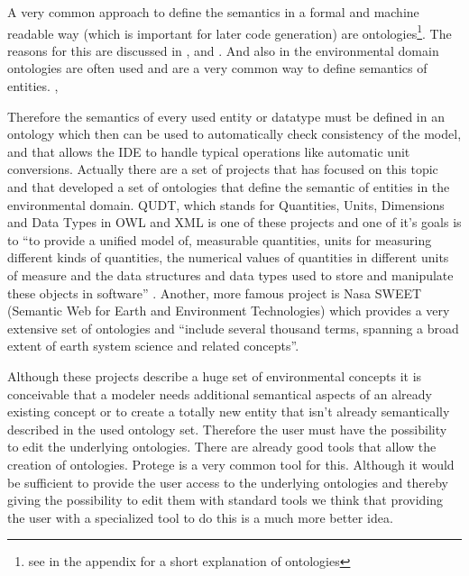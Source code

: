 A very common approach to define the semantics in a formal and machine readable way (which is important for later code generation) are ontologies\footnote{see  in the appendix for a short explanation of ontologies}. The reasons for this are discussed in \autocite{toolchain:protege_onto}, \autocite{toolchain:gruber} and \autocite{toolchain:musen}. And also in the environmental domain ontologies are often used and are a very common way to define semantics of entities. \autocite{dsl:muetzelfeldt}, \autocite{Villa2009577}


Therefore the semantics of every used entity or datatype must be defined in an ontology which then can be used to automatically check consistency of the model, and that allows the IDE to handle typical operations like automatic unit conversions. Actually there are a set of projects that has focused on this topic  and that developed a set of ontologies that define the semantic of entities in the environmental domain.  QUDT, which stands for Quantities, Units, Dimensions and Data Types in OWL and XML \autocite{toolchain:qudt} is one of these projects and one of it’s goals is to ``to provide a unified model of, measurable quantities, units for measuring different kinds of quantities, the numerical values of quantities in different units of measure and the data structures and data types used to store and manipulate these objects in software'' \autocite{toolchain:qudt}. Another, more famous project is Nasa SWEET (Semantic Web for Earth and Environment Technologies) \autocite{toolchain:nasa_sweet} which provides a very extensive set of ontologies and ``include several thousand terms, spanning a broad extent of earth system science and related concepts''\autocite{nasa_sweet_guide}.


Although these projects describe a huge set of environmental concepts it is conceivable that a modeler needs additional semantical aspects of an already existing concept or to create a totally new entity that isn’t already semantically described in the used ontology set. Therefore the user must have the possibility to edit the underlying ontologies.  There are already good tools that allow the creation of ontologies. Protege \autocite{dsl:protege} is a very common tool for this. Although it would be sufficient to provide the user access to the underlying ontologies and thereby giving  the possibility to edit them with standard tools we think that providing the user with a specialized tool to do this is a much more better idea.


